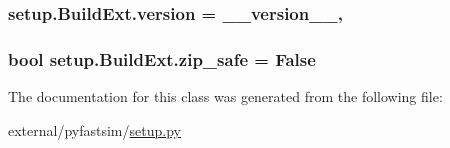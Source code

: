 \subsubsection[{\texorpdfstring{version}{version}}]{\setlength{\rightskip}{0pt plus 5cm}setup.\+Build\+Ext.\+version = \+\_\+\+\_\+version\+\_\+\+\_\+,\hspace{0.3cm}{\ttfamily [static]}}\hypertarget{classsetup_1_1_build_ext_ae0126fa9abc1ef98f9f444fa137a9cd3}{}\label{classsetup_1_1_build_ext_ae0126fa9abc1ef98f9f444fa137a9cd3}
\subsubsection[{\texorpdfstring{zip\+\_\+safe}{zip_safe}}]{\setlength{\rightskip}{0pt plus 5cm}bool setup.\+Build\+Ext.\+zip\+\_\+safe = False\hspace{0.3cm}{\ttfamily [static]}}\hypertarget{classsetup_1_1_build_ext_a03620bc93383f8f6667f07e5663280a6}{}\label{classsetup_1_1_build_ext_a03620bc93383f8f6667f07e5663280a6}


The documentation for this class was generated from the following file\+:\begin{DoxyCompactItemize}
\item 
external/pyfastsim/\hyperlink{external_2pyfastsim_2setup_8py}{setup.\+py}\end{DoxyCompactItemize}
